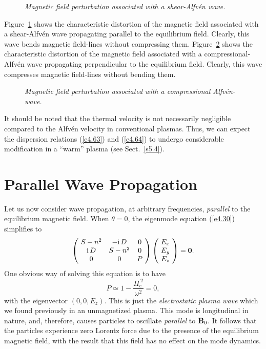 \begin{figure}
\epsfysize=2.5in
\centerline{}
\caption{\em Magnetic field perturbation associated with a shear-Alfv\'en
wave.}\label{f10}
\end{figure}

Figure~\ref{f10} shows the characteristic distortion of the magnetic field 
associated with a shear-Alfv\'{e}n wave propagating parallel to the
equilibrium field. Clearly, this wave bends magnetic field-lines without
compressing them. Figure~\ref{f11} shows the characteristic distortion of the
 magnetic field 
associated with a compressional-Alfv\'{e}n wave propagating perpendicular to the
equilibrium field. Clearly, this wave compresses magnetic field-lines without
bending them.

\begin{figure}
\epsfysize=2.5in
\centerline{}
\caption{\em Magnetic field perturbation associated with a compressional
Alfv\'{e}n-wave.}\label{f11}
\end{figure}

It should be noted that the thermal velocity is not necessarily  negligible
compared to the Alfv\'{e}n velocity in conventional plasmas. Thus,
we can expect the dispersion relations (\ref{e4.63}) and (\ref{e4.64}) to
undergo considerable modification in a ``warm'' plasma (see Sect.~\ref{s5.4}). 

\section{Parallel Wave Propagation}
Let us now consider wave propagation, at arbitrary frequencies, {\em parallel}\/
to the equilibrium magnetic field. When $\theta=0$, the eigenmode equation
(\ref{e4.30}) simplifies to
\begin{equation}\label{e4.68}
\left(\!\begin{array}{ccc}
S - n^2 & -{\rm i}\,D & 0\\
{\rm i} \,D           & S - n^2     & 0 \\
0& 0 & P 
\end{array}\!\right)\left(\!
\begin{array}{c} E_x\\ E_y \\ E_z \end{array}\!\right) = {\bf 0}.
\end{equation}
One obvious way of solving this equation  is to have 
\begin{equation} 
P \simeq 1 - \frac{{\Pi}_e^{~2}}{\omega^2} = 0,
\end{equation}
with the eigenvector $(0,0,E_z)$. This is just the {\em electrostatic plasma wave}
which we found previously in an unmagnetized plasma. This mode is
longitudinal in nature, and, therefore, causes particles to
oscillate {\em parallel} to ${\bf B}_0$. It follows that the particles
experience zero Lorentz force due to the presence of the equilibrium magnetic
field, with the result that this field has no effect on the mode dynamics. 

